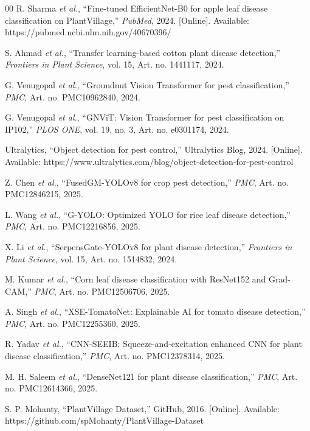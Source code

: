 \documentclass[conference]{IEEEtran}
\begin{document}
\begin{thebibliography}{00}
R. Sharma \textit{et al.}, ``Fine-tuned EfficientNet-B0 for apple leaf disease classification on PlantVillage,'' \textit{PubMed}, 2024. [Online]. Available: https://pubmed.ncbi.nlm.nih.gov/40670396/

S. Ahmad \textit{et al.}, ``Transfer learning-based cotton plant disease detection,'' \textit{Frontiers in Plant Science}, vol. 15, Art. no. 1441117, 2024.

G. Venugopal \textit{et al.}, ``Groundnut Vision Transformer for pest classification,'' \textit{PMC}, Art. no. PMC10962840, 2024.

G. Venugopal \textit{et al.}, ``GNViT: Vision Transformer for pest classification on IP102,'' \textit{PLOS ONE}, vol. 19, no. 3, Art. no. e0301174, 2024.

Ultralytics, ``Object detection for pest control,'' Ultralytics Blog, 2024. [Online]. Available: https://www.ultralytics.com/blog/object-detection-for-pest-control

Z. Chen \textit{et al.}, ``FusedGM-YOLOv8 for crop pest detection,'' \textit{PMC}, Art. no. PMC12846215, 2025.

L. Wang \textit{et al.}, ``G-YOLO: Optimized YOLO for rice leaf disease detection,'' \textit{PMC}, Art. no. PMC12216856, 2025.

X. Li \textit{et al.}, ``SerpensGate-YOLOv8 for plant disease detection,'' \textit{Frontiers in Plant Science}, vol. 15, Art. no. 1514832, 2024.

M. Kumar \textit{et al.}, ``Corn leaf disease classification with ResNet152 and Grad-CAM,'' \textit{PMC}, Art. no. PMC12506706, 2025.

A. Singh \textit{et al.}, ``XSE-TomatoNet: Explainable AI for tomato disease detection,'' \textit{PMC}, Art. no. PMC12255360, 2025.

R. Yadav \textit{et al.}, ``CNN-SEEIB: Squeeze-and-excitation enhanced CNN for plant disease classification,'' \textit{PMC}, Art. no. PMC12378314, 2025.

M. H. Saleem \textit{et al.}, ``DenseNet121 for plant disease classification,'' \textit{PMC}, Art. no. PMC12614366, 2025.

S. P. Mohanty, ``PlantVillage Dataset,'' GitHub, 2016. [Online]. Available: https://github.com/spMohanty/PlantVillage-Dataset


\end{thebibliography}
\end{document}
